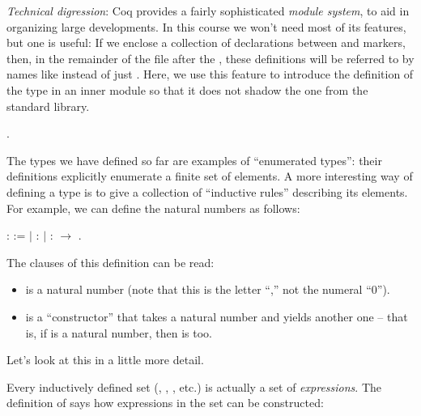 \documentclass[12pt]{report}
\begin{document}
 \textit{Technical digression}: Coq provides a fairly sophisticated
    \textit{module system}, to aid in organizing large developments.  In this
    course we won't need most of its features, but one is useful: If
    we enclose a collection of declarations between   and
      markers, then, in the remainder of the file after the
    , these definitions will be referred to by names like 
    instead of just .  Here, we use this feature to introduce the
    definition of the type  in an inner module so that it does
    not shadow the one from the standard library. \begin{coqdoccode}
\coqdocemptyline
\coqdocnoindent
{} .\coqdoceol
\coqdocemptyline
\end{coqdoccode}
The types we have defined so far are examples of ``enumerated
    types'': their definitions explicitly enumerate a finite set of
    elements.  A more interesting way of defining a type is to give a
    collection of ``inductive rules'' describing its elements.  For
    example, we can define the natural numbers as follows: \begin{coqdoccode}
\coqdocemptyline
\coqdocnoindent
{}  :  :=\coqdoceol
\coqdocindent{1.00em}
\ensuremath{|}  : \coqdoceol
\coqdocindent{1.00em}
\ensuremath{|}  :  \ensuremath{\rightarrow} .\coqdoceol
\coqdocemptyline
\end{coqdoccode}
The clauses of this definition can be read: 



\begin{itemize}
\item  {} is a natural number (note that this is the letter ``,'' not
        the numeral ``0'').

\item  {} is a ``constructor'' that takes a natural number and yields
        another one -- that is, if  is a natural number, then  
        is too.

\end{itemize}


    Let's look at this in a little more detail.  


    Every inductively defined set (, , , etc.) is
    actually a set of \textit{expressions}.  The definition of  says how
    expressions in the set  can be constructed:
\end{document}
